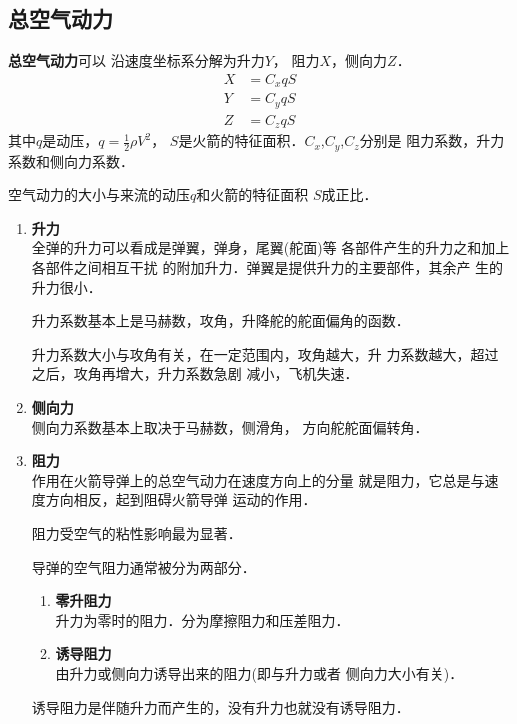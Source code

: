 \subsection{总空气动力}
{\bfseries 总空气动力}可以
沿速度坐标系分解为升力$Y$，
阻力$X$，侧向力$Z$．
\begin{equation*}
	\begin{split}
		X&=C_x q S \\
		Y&=C_y q S \\
		Z&=C_z q S
	\end{split}
\end{equation*}
其中$q$是动压，$q=\frac{1}{2}\rho V^2$，
$S$是火箭的特征面积．$C_x$,$C_y$,$C_z$分别是
阻力系数，升力系数和侧向力系数．
\begin{note}
	空气动力的大小与来流的动压$q$和火箭的特征面积
	$S$成正比．
\end{note}
\begin{notice}
	\begin{enumerate}
		\item {\bfseries 升力} \\
		      全弹的升力可以看成是弹翼，弹身，尾翼(舵面)等
		      各部件产生的升力之和加上各部件之间相互干扰
		      的附加升力．弹翼是提供升力的主要部件，其余产
		      生的升力很小．

          升力系数基本上是马赫数，攻角，升降舵的舵面偏角的函数．
		      \begin{note}
			      升力系数大小与攻角有关，在一定范围内，攻角越大，升
			      力系数越大，超过之后，攻角再增大，升力系数急剧
			      减小，飞机失速．
		      \end{note}
        \item {\bfseries 侧向力}\\ 
          侧向力系数基本上取决于马赫数，侧滑角，
          方向舵舵面偏转角．
		\item {\bfseries 阻力} \\
		      作用在火箭导弹上的总空气动力在速度方向上的分量
		      就是阻力，它总是与速度方向相反，起到阻碍火箭导弹
		      运动的作用．
		      \begin{note}
			      阻力受空气的粘性影响最为显著．
		      \end{note}
		      导弹的空气阻力通常被分为两部分．
		      \begin{enumerate}
			      \item {\bfseries 零升阻力}\\
			            升力为零时的阻力．分为摩擦阻力和压差阻力．
			      \item {\bfseries 诱导阻力}\\
			            由升力或侧向力诱导出来的阻力(即与升力或者
			            侧向力大小有关)．
		      \end{enumerate}
          诱导阻力是伴随升力而产生的，没有升力也就没有诱导阻力．
	\end{enumerate}
\end{notice}

